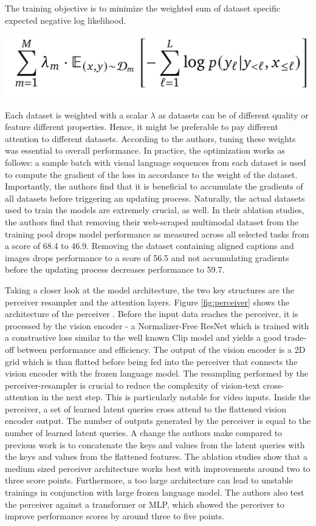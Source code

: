 \documentclass[
]{krantz}
\begin{document}
The training objective is to minimize the weighted sum of dataset specific expected negative log likelihood.

\begin{center}\includegraphics[width=0.5\linewidth]{figures/05-chapter2/dataseteq} \end{center}

Each dataset is weighted with a scalar \(\lambda\) as datasets can be of different quality or feature different properties. Hence, it might be preferable to pay different attention to different datasets. According to the authors, tuning these weights was essential to overall performance. In practice, the optimization works as follows: a sample batch with visual language sequences from each dataset is used to compute the gradient of the loss in accordance to the weight of the dataset. Importantly, the authors find that it is beneficial to accumulate the gradients of all datasets before triggering an updating process. Naturally, the actual datasets used to train the models are extremely crucial, as well. In their ablation studies, the authors find that removing their web-scraped multimodal dataset from the training pool drops model performance as measured across all selected tasks from a score of 68.4 to 46.9. Removing the dataset containing aligned captions and images drops performance to a score of 56.5 and not accumulating gradients before the updating process decreases performance to 59.7.

Taking a closer look at the model architecture, the two key structures are the perceiver resampler and the attention layers. Figure \ref{fig:perceiver} shows the architecture of the perceiver \citep{jaegle2021perceiver}. Before the input data reaches the perceiver, it is processed by the vision encoder - a Normalizer-Free ResNet which is trained with a constrastive loss similar to the well known Clip model \citep{radford2021learning} and yields a good trade-off between performance and efficiency. The output of the vision encoder is a 2D grid which is than flatted before being fed into the perceiver that connects the vision encoder with the frozen language model. The resampling performed by the perceiver-resampler is crucial to reduce the complexity of vision-text cross-attention in the next step. This is particularly notable for video inputs. Inside the perceiver, a set of learned latent queries cross attend to the flattened vision encoder output. The number of outputs generated by the perceiver is equal to the number of learned latent queries. A change the authors make compared to previous work is to concatenate the keys and values from the latent queries with the keys and values from the flattened features. The ablation studies show that a medium sized perceiver architecture works best with improvements around two to three score points. Furthermore, a too large architecture can lead to unstable trainings in conjunction with large frozen language model. The authors also test the perceiver against a transformer or MLP, which showed the perceiver to improve performance scores by around three to five points.
\end{document}
